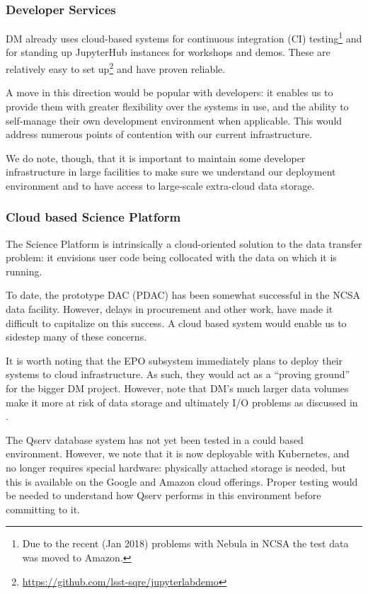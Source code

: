 \subsubsection{Developer Services}

DM already uses cloud-based systems for continuous integration (CI) testing\footnote{Due to the recent (Jan 2018) problems with Nebula in NCSA the test data was moved to Amazon.} and for standing up JupyterHub instances for workshops and demos.
These are relatively easy to set up\footnote{\url{https://github.com/lsst-sqre/jupyterlabdemo}} and have proven reliable.

A move in this direction would be popular with developers: it enables us to provide them with greater flexibility over the systems in use, and the ability to self-manage their own development environment when applicable.
This would address numerous points of contention with our current infrastructure.

We do note, though, that it is important to maintain some developer infrastructure in large facilities to make sure we understand our deployment environment and to have access to large-scale extra-cloud data storage.

\subsubsection{Cloud based Science Platform}
\label{sect:platform}

The Science Platform is intrinsically a cloud-oriented solution to the data transfer problem: it envisions user code being collocated with the data on which it is running.

To date, the prototype DAC (PDAC) has been somewhat successful in the NCSA data facility.
However, delays in procurement and other work, have made it difficult to capitalize on this success.
A cloud based system would enable us to sidestep many of these concerns.

It is worth noting that the EPO subsystem immediately plans to deploy their systems to cloud infrastructure.
As such, they would act as a “proving ground” for the bigger DM project.
However, note that DM's much larger data volumes make it more at risk of data storage and ultimately I/O problems as discussed in .

The Qserv database system has not yet been tested in a could based environment.
However, we note that it is now deployable with Kubernetes, and no longer requires special hardware: physically attached storage is needed, but this is available on the Google and Amazon cloud offerings.
Proper testing would be needed to understand how Qserv performs in this environment before committing to it.


